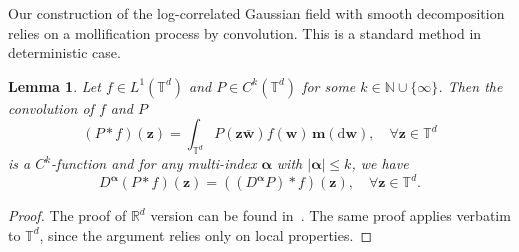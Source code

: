\documentclass[12pt]{amsart}
\newtheorem{lemma}[theorem]{Lemma}
\theoremstyle{definition}
\theoremstyle{remark}
\newcommand{\bz}{\boldsymbol{z}}
\newcommand{\bw}{\boldsymbol{w}}
\newcommand{\R}{\mathbb{R}}
\newcommand{\N}{\mathbb{N}}
\newcommand{\T}{\mathbb{T}}
\numberwithin{equation}{section}
\begin{document}
Our construction of the log-correlated Gaussian field with smooth decomposition relies on a mollification process by convolution. This is a standard method in deterministic case.
\begin{lemma}\label{lemma:convolution-deterministic}
	Let $f\in L^1(\T^d)$ and $P\in C^k(\T^d)$ for some $k\in \N\cup\{\infty\}$. Then the convolution of $f$ and $P$
	\[
	(P*f)(\bz)=\int_{\T^d} P(\bz\bar{\bw})f(\bw)\,\boldsymbol{m}(\mathrm{d}\bw),\quad \forall \bz \in \T^d
	\]
	is a $C^k$-function and for any multi-index $\boldsymbol{\alpha}$ with $|\boldsymbol{\alpha}|\le k$, we have
	\begin{equation}\label{eq:diff-convolution}
	D^{\boldsymbol{\alpha}}(P*f)(\bz)=((D^{\boldsymbol{\alpha}} P)*f)(\bz),\quad \forall \bz\in \T^d.
	\end{equation}
\end{lemma}
\begin{proof}
	The proof of $\R^d$ version can be found in~\cite[Proposition~4.20]{Bre11}. The same proof applies verbatim to $\T^d$, since the argument relies only on local properties.
\end{proof}
\end{document}
